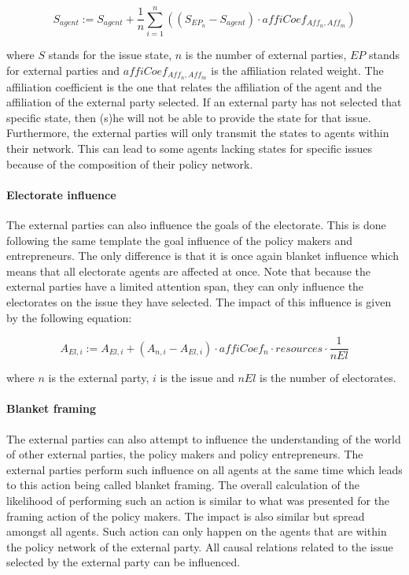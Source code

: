 \begin{equation}
S_{agent} := S_{agent} + \frac{1}{n} \sum_{i=1}^n \left( \left(S_{EP_n} - S_{agent} \right) \cdot affiCoef_{Aff_n,Aff_m} \right)
\end{equation}

where $S$ stands for the issue state, $n$ is the number of external parties, $EP$ stands for external parties and $affiCoef_{Aff_n,Aff_m}$ is the affiliation related weight. The affiliation coefficient is the one that relates the affiliation of the agent and the affiliation of the external party selected. If an external party has not selected that specific state, then (s)he will not be able to provide the state for that issue. Furthermore, the external parties will only transmit the states to agents within their network. This can lead to some agents lacking states for specific issues because of the composition of their policy network.

\paragraph{Electorate influence}

The external parties can also influence the goals of the electorate. This is done following the same template the goal influence of the policy makers and entrepreneurs. The only difference is that it is once again blanket influence which means that all electorate agents are affected at once. Note that because the external parties have a limited attention span, they can only influence the electorates on the issue they have selected. The impact of this influence is given by the following equation:

\begin{equation}
A_{El, i} := A_{El, i} + \left(A_{n, i} - A_{El, i} \right) \cdot affiCoef_n \cdot resources \cdot \frac{1}{nEl}
\end{equation}

where $n$ is the external party, $i$ is the issue and $nEl$ is the number of electorates.

\paragraph{Blanket framing}

The external parties can also attempt to influence the understanding of the world of other external parties, the policy makers and policy entrepreneurs. The external parties perform such influence on all agents at the same time which leads to this action being called blanket framing. The overall calculation of the likelihood of performing such an action is similar to what was presented for the framing action of the policy makers. The impact is also similar but spread amongst all agents. Such action can only happen on the agents that are within the policy network of the external party. All causal relations related to the issue selected by the external party can be influenced.

